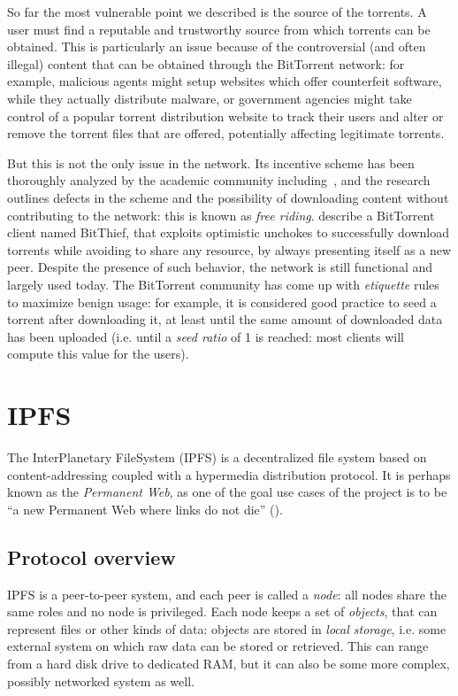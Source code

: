 \documentclass[mscthesis]{usiinfthesis}
\begin{document}
So far the most vulnerable point we described is the source of the torrents. A user must find a reputable and trustworthy source from which torrents can be obtained. This is particularly an issue because of the controversial (and often illegal) content that can be obtained through the BitTorrent network: for example, malicious agents might setup websites which offer counterfeit software, while they actually distribute malware, or government agencies might take control of a popular torrent distribution website to track their users and alter or remove the torrent files that are offered, potentially affecting legitimate torrents.

But this is not the only issue in the network. Its incentive scheme has been thoroughly analyzed by the academic community including~\cite{Zghaibeh2008}, and the research outlines defects in the scheme and the possibility of downloading content without contributing to the network: this is known as \emph{free riding}. \cite{locher2006free} describe a BitTorrent client named BitThief, that exploits optimistic unchokes to successfully download torrents while avoiding to share any resource, by always presenting itself as a new peer. Despite the presence of such behavior, the network is still functional and largely used today. The BitTorrent community has come up with \textit{etiquette} rules to maximize benign usage: for example, it is considered good practice to seed a torrent after downloading it, at least until the same amount of downloaded data has been uploaded (i.e. until a \textit{seed ratio} of 1 is reached: most clients will compute this value for the users).

\section{IPFS}\label{proj:ipfs}

The InterPlanetary FileSystem (IPFS) is a decentralized file system based on content-addressing coupled with a hypermedia distribution protocol. It is perhaps known as the \textit{Permanent Web}, as one of the goal use cases of the project is to be ``a new Permanent Web where links do not die'' (\cite{benet2014ipfs}).

\subsection{Protocol overview}

IPFS is a peer-to-peer system, and each peer is called a \emph{node}: all nodes share the same roles and no node is privileged. Each node keeps a set of \emph{objects}, that can represent files or other kinds of data: objects are stored in \emph{local storage}, i.e. some external system on which raw data can be stored or retrieved. This can range from a hard disk drive to dedicated RAM, but it can also be some more complex, possibly networked system as well.
\end{document}
